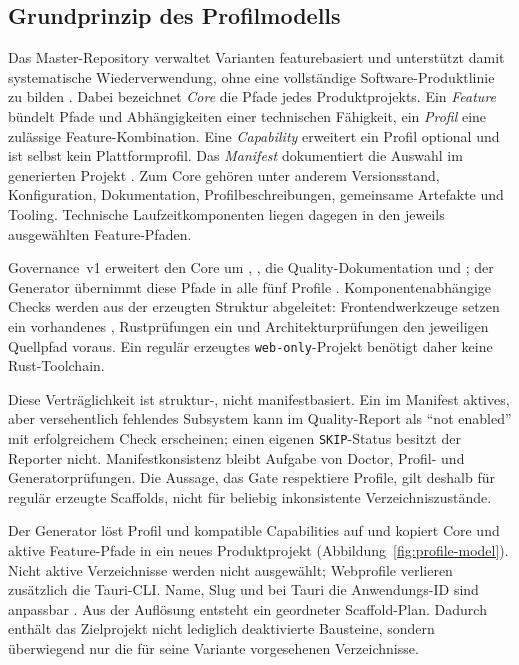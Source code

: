 \subsection{Grundprinzip des Profilmodells}
\label{subsec:grundprinzip-profilmodell}

Das Master-Repository verwaltet Varianten featurebasiert und unterstützt damit
systematische Wiederverwendung, ohne eine vollständige Software-Produktlinie
zu bilden
\parencite{clements2001software-product-lines,krueger1992software-reuse}.
Dabei bezeichnet \emph{Core} die Pfade jedes Produktprojekts. Ein
\emph{Feature} bündelt Pfade und Abhängigkeiten einer technischen Fähigkeit,
ein \emph{Profil} eine zulässige Feature-Kombination. Eine \emph{Capability}
erweitert ein Profil optional und ist selbst kein Plattformprofil. Das
\emph{Manifest} dokumentiert die Auswahl im generierten Projekt
\parencite{kleiveist2026profiles,kleiveist2026governance-snapshot}.
Zum Core gehören unter anderem Versionsstand, Konfiguration, Dokumentation,
Profilbeschreibungen, gemeinsame Artefakte und Tooling. Technische
Laufzeitkomponenten liegen dagegen in den jeweils ausgewählten Feature-Pfaden.

Governance~v1 erweitert den Core um ,
, die Quality-Dokumentation und
; der Generator übernimmt diese Pfade in alle fünf
Profile \parencite{kleiveist2026quality-policy}. Komponentenabhängige Checks
werden aus der erzeugten Struktur abgeleitet: Frontendwerkzeuge setzen ein
vorhandenes , Rustprüfungen ein
 und Architekturprüfungen den jeweiligen Quellpfad
voraus. Ein regulär erzeugtes \texttt{web-only}-Projekt benötigt daher keine
Rust-Toolchain.

Diese Verträglichkeit ist struktur-, nicht manifestbasiert. Ein im Manifest
aktives, aber versehentlich fehlendes Subsystem kann im Quality-Report als
\enquote{not enabled} mit erfolgreichem Check erscheinen; einen eigenen
\texttt{SKIP}-Status besitzt der Reporter nicht. Manifestkonsistenz bleibt
Aufgabe von Doctor, Profil- und Generatorprüfungen. Die Aussage, das Gate
respektiere Profile, gilt deshalb für regulär erzeugte Scaffolds, nicht für
beliebig inkonsistente Verzeichniszustände.



Der Generator löst Profil und kompatible Capabilities auf und kopiert Core und
aktive Feature-Pfade in ein neues Produktprojekt
(Abbildung~\ref{fig:profile-model}). Nicht aktive Verzeichnisse werden nicht
ausgewählt; Webprofile verlieren zusätzlich die Tauri-CLI. Name, Slug und bei
Tauri die Anwendungs-ID sind anpassbar
\parencite{kleiveist2026profiles,kleiveist2026tooling}.
Aus der Auflösung entsteht ein geordneter Scaffold-Plan. Dadurch enthält das
Zielprojekt nicht lediglich deaktivierte Bausteine, sondern überwiegend nur die
für seine Variante vorgesehenen Verzeichnisse.

